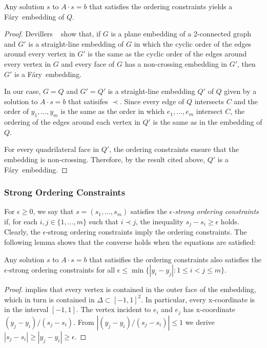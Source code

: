 \documentclass{patmorin}
\newcommand{\Fary}{Fáry}
\begin{document}
\begin{lem}
   Any solution $s$ to $A\cdot s=b$ that satisfies
 the ordering constraints %
 yields a
   \Fary\ embedding of $Q$.
\end{lem}

\begin{proof}
   Devillers \etal\ \cite[Lemma~16]{devillers.liotta.ea:checking} show
   that, if $G$ is a plane embedding of a 2-connected graph and $G'$
   is a straight-line embedding of $G$ in which the cyclic order of the
   edges around every vertex in $G'$ is the same as the cyclic order
   of the edges around every vertex in $G$ and every face of $G$
   has a non-crossing embedding in $G'$, then $G'$ is a \Fary\ embedding.

   In our case, $G=Q$ and $G'=Q'$ is a straight-line embedding $Q'$ of $Q$
   given by a solution to $A\cdot s = b$ that satisifes $\prec$.  Since
   every edge of $Q$ intersects $C$ and the order of $y_1,\ldots,y_m$
   is the same as the order in which $e_1,\ldots,e_m$ intersect $C$, the
   ordering of the edges around each vertex in $Q'$ is the same as in the
   embedding of $Q$. 

   For every quadrilateral face in $Q'$, the ordering constraints
   ensure that the embedding is non-crossing. Therefore, by the result
   cited above, $Q'$ is a \Fary\ embedding. %
\end{proof}


\subsubsection{Strong Ordering Constraints}

For $\epsilon \ge 0$, we say that $s=(s_1,\ldots,s_m)$ satisfies
the \emph{$\epsilon$-strong ordering constraints} if, for each
$i,j\in\{1,\ldots,m\}$ such that $i\prec j$, the inequality
$s_j-s_i\ge \epsilon$ holds.
Clearly, the $\epsilon$-strong
ordering constraints imply the ordering constraints. The following lemma shows
that the converse holds when the equations are satisfied:

\begin{lem}
   Any solution $s$ to $A\cdot s=b$ that satisifies
the ordering constraints
 also satisfies 
   the $\epsilon$-strong ordering constraints
   for all $\epsilon\le\min\{|y_i-y_j| : 1\le i< j\le m\}$.
\end{lem}

\begin{proof}
    implies that every vertex is
contained in the outer face of the
   embedding, which in turn is contained in $\Delta\subset[-1,1]^2$.
In particular, every x-coordinate is
in the interval $[-1,1]$.
The vertex incident to $e_i$ and $e_j$ has x-coordinate
   $(y_j-y_i)/(s_j-s_i)$.
From $|(y_j-y_i)/(s_j-s_i)|\le 1$ we derive
   $|s_j-s_i|\ge|y_j-y_i| \ge \epsilon$.
\end{proof}
\end{document}
